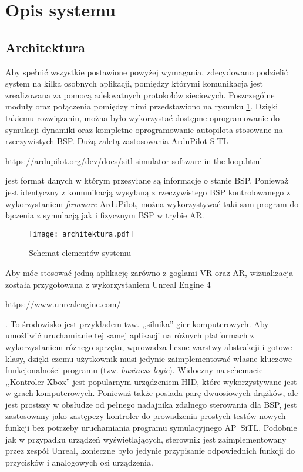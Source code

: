 \newpage
\section{Opis systemu}

\subsection{Architektura}

Aby spełnić wszystkie postawione powyżej wymagania, zdecydowano podzielić system na kilka osobnych aplikacji, pomiędzy którymi komunikacja jest zrealizowana za pomocą adekwatnych protokołów sieciowych. Poszczególne moduły oraz połączenia pomiędzy nimi przedstawiono na rysunku \ref{fig:architektura}. Dzięki takiemu rozwiązaniu, można było wykorzystać dostępne oprogramowanie do symulacji dynamiki oraz kompletne oprogramowanie autopilota stosowane na rzeczywistych BSP. Dużą zaletą zastosowania ArduPilot SiTL \begin{todo}https://ardupilot.org/dev/docs/sitl-simulator-software-in-the-loop.html\end{todo} jest format danych w którym przesyłane są informacje o stanie BSP. Ponieważ jest identyczny z komunikacją wysyłaną z rzeczywistego BSP kontrolowanego z wykorzystaniem \emph
{firmware} ArduPilot, można wykorzystywać taki sam program do łączenia z symulacją jak i fizycznym BSP w trybie AR.

\begin{figure}[!h]
    \caption{Schemat elementów systemu}
    \label{fig:architektura}
    \centering \texttt{[image: architektura.pdf]}
\end{figure}

Aby móc stosować jedną aplikację zarówno z goglami VR oraz AR, wizualizacja została przygotowana z wykorzystaniem Unreal Engine 4 \begin{todo}https://www.unrealengine.com/\end{todo}. To środowisko jest przykładem tzw. ,,silnika'' gier komputerowych. Aby umożliwić uruchamianie tej samej aplikacji na różnych platformach z wykorzystaniem różnego sprzętu, wprowadza liczne warstwy abstrakcji i gotowe klasy, dzięki czemu użytkownik musi jedynie zaimplementować własne kluczowe funkcjonalności programu (tzw. \emph{business logic}). Widoczny na schemacie ,,Kontroler Xbox'' jest popularnym urządzeniem HID, które wykorzystywane jest w grach komputerowych. Ponieważ także posiada parę dwuosiowych drążków, ale jest prostszy w obsłudze od pełnego nadajnika zdalnego sterowania dla BSP, jest zastosowany jako zastępczy kontroler do prowadzenia prostych testów nowych funkcji bez potrzeby uruchamiania programu symulacyjnego AP~SiTL. Podobnie jak w przypadku urządzeń wyświetlających, sterownik jest zaimplementowany przez zespół Unreal, konieczne było jedynie przypisanie odpowiednich funkcji do przycisków i analogowych osi urządzenia.

